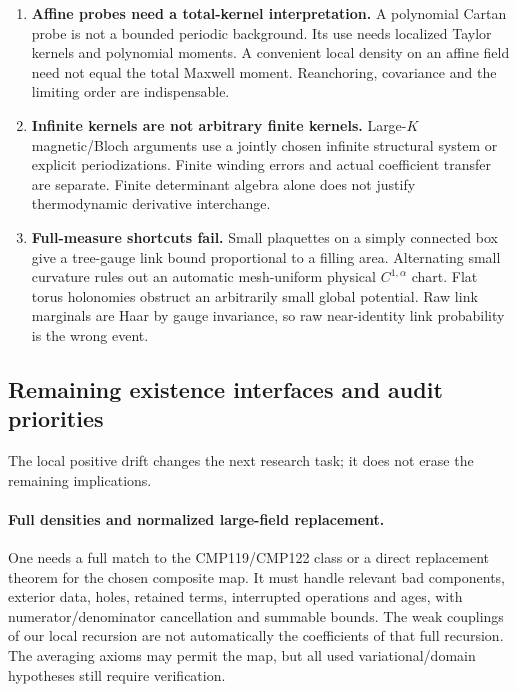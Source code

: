 \begin{enumerate}
\item \textbf{Affine probes need a
total-kernel interpretation.}
A polynomial Cartan probe is not
a bounded periodic background.
Its use needs localized Taylor
kernels and polynomial moments.
A convenient local density on an
affine field need not equal the
total Maxwell moment. Reanchoring,
covariance and the limiting order
are indispensable.

\item \textbf{Infinite kernels are
not arbitrary finite kernels.}
Large-\(K\) magnetic/Bloch arguments
use a jointly chosen infinite
structural system or explicit
periodizations. Finite winding
errors and actual coefficient
transfer are separate.
Finite determinant algebra alone
does not justify thermodynamic
derivative interchange.

\item \textbf{Full-measure shortcuts
fail.}
Small plaquettes on a simply
connected box give a tree-gauge
link bound proportional to a
filling area. Alternating small
curvature rules out an automatic
mesh-uniform physical
\(C^{1,\alpha}\) chart.
Flat torus holonomies obstruct
an arbitrarily small global
potential. Raw link marginals
are Haar by gauge invariance,
so raw near-identity link
probability is the wrong event.
\end{enumerate}

\subsection{Remaining existence interfaces and audit priorities}
\label{hrb-remaining}

The local positive drift changes the
next research task; it does not
erase the remaining implications.

\paragraph{Full densities and
normalized large-field replacement.}
One needs a full match to the
CMP119/CMP122 class or a direct
replacement theorem for the chosen
composite map. It must handle
relevant bad components, exterior
data, holes, retained terms,
interrupted operations and ages,
with numerator/denominator
cancellation and summable bounds.
The weak couplings of our local
recursion are not automatically
the coefficients of that full
recursion. The averaging axioms
may permit the map, but all used
variational/domain hypotheses
still require verification.

